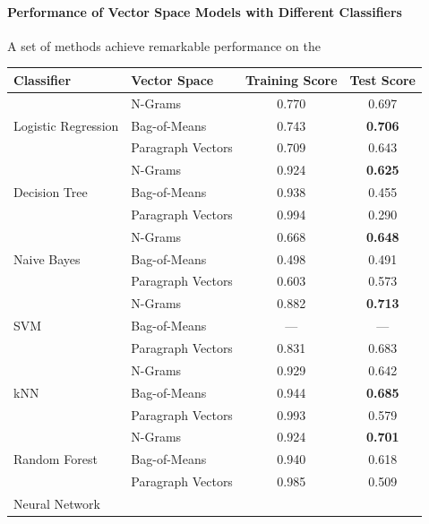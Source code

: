 \paragraph{Performance of Vector Space Models with Different Classifiers}
\label{par:Performance of Vector Space Models with Different Classifiers}


A set of methods achieve remarkable performance on the

\begin{table}[h]
  \begin{center}
    \begin{tabular}{ ll cc }
      \toprule
      Classifier & Vector Space & Training Score & Test Score \\
      \midrule
      \multirow{3}{*}{Logistic Regression}
       & N-Grams & 0.770 & 0.697 \\
       & Bag-of-Means & 0.743 & \textbf{0.706} \\
       & Paragraph Vectors & 0.709 & 0.643 \\
      \midrule
      \multirow{3}{*}{Decision Tree}
       & N-Grams & 0.924 & \textbf{0.625} \\
       & Bag-of-Means & 0.938 & 0.455 \\
       & Paragraph Vectors & 0.994 & 0.290 \\
      \midrule
      \multirow{3}{*}{Naive Bayes}
       & N-Grams & 0.668 & \textbf{0.648} \\
       & Bag-of-Means & 0.498 & 0.491 \\
       & Paragraph Vectors & 0.603 & 0.573 \\
      \midrule
      \multirow{3}{*}{SVM}
       & N-Grams & 0.882 & \textbf{0.713} \\
       & Bag-of-Means & --- & --- \\
       & Paragraph Vectors & 0.831 & 0.683 \\
      \midrule
      \multirow{3}{*}{kNN}
       & N-Grams & 0.929 & 0.642 \\
       & Bag-of-Means & 0.944 & \textbf{0.685} \\
       & Paragraph Vectors & 0.993 & 0.579 \\
      \midrule
      \multirow{3}{*}{Random Forest}
       & N-Grams & 0.924 & \textbf{0.701} \\
       & Bag-of-Means & 0.940 & 0.618 \\
       & Paragraph Vectors & 0.985 & 0.509 \\
      \midrule
      \multirow{3}{*}{Neural Network}

\end{tabular}
\end{center}
\end{table}
